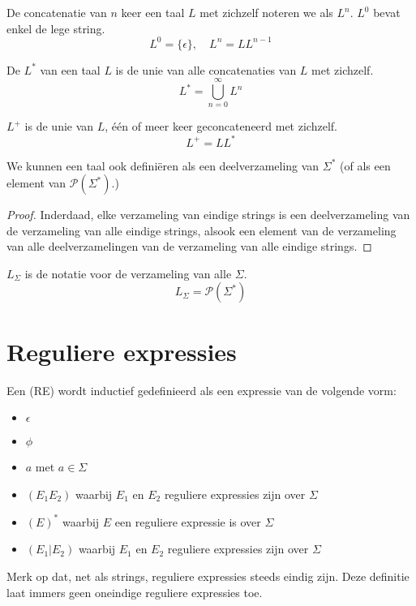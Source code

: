 \documentclass[main.tex]{subfiles}
\begin{document}
\begin{de}
  De concatenatie van $n$ keer een taal $L$ met zichzelf noteren we als $L^n$.
  $L^0$ bevat enkel de lege string.
  \[
  L^0 = \{\epsilon\},\quad L^{n} = LL^{n-1}
  \]
\end{de}

\begin{de}
  De  $L^*$ van een taal $L$ is de unie van alle concatenaties van $L$ met zichzelf.
  \[
  L^* = \bigcup_{n=0}^{\infty}L^n
  \]
\end{de}

\begin{de}
  $L^{+}$ is de unie van $L$, \'e\'en of meer keer geconcateneerd met zichzelf.
  \[
  L^{+} = LL^{*}
  \]
\end{de}

\begin{ei}
  \label{ei:taal-alternatieve-definitie}
  We kunnen een taal ook defini\"eren als een deelverzameling van $\Sigma^{*}$ (of als een element van $\mathcal{P}(\Sigma^{*})$.)

  \begin{proof}
    Inderdaad, elke verzameling van eindige strings is een deelverzameling van de verzameling van alle eindige strings, alsook een element van de verzameling van alle deelverzamelingen van de verzameling van alle eindige strings.
  \end{proof}
\end{ei}

\begin{de}
  $L_{\Sigma}$ is de notatie voor de verzameling van alle  $\Sigma$. 
  \[ L_{\Sigma} = \mathcal{P}(\Sigma^{*}) \]
\end{de}

\section{Reguliere expressies}
\label{sec:reguliere-expressies}

\begin{de}
  Een  (RE) wordt inductief gedefinieerd als een expressie van de volgende vorm:
  \begin{itemize}
  \item $\epsilon$
  \item $\phi$
  \item $a$ met $a \in \Sigma$
  \item $(E_1E_2)$ waarbij $E_1$ en $E_2$ reguliere expressies zijn over $\Sigma$
  \item $(E)^*$ waarbij $E$ een reguliere expressie is over $\Sigma$
  \item $(E_1|E_2)$ waarbij $E_1$ en $E_2$ reguliere expressies zijn over $\Sigma$
  \end{itemize}
  Merk op dat, net als strings, reguliere expressies steeds eindig zijn.
  Deze definitie laat immers geen oneindige reguliere expressies toe.
\end{de}
\end{document}
